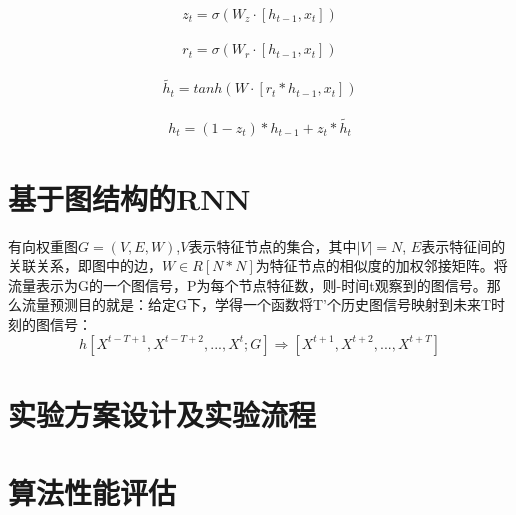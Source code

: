   \begin{equation}
    \begin{aligned}
        z_t = \sigma(W_z\cdot [h_{t-1},x_t])
    \end{aligned}
\end{equation}

\begin{equation}
    \begin{aligned}
        r_t = \sigma(W_r\cdot[h_{t-1},x_t])
    \end{aligned}
\end{equation}

\begin{equation}
    \begin{aligned}
        \widetilde {h_t} = tanh(W\cdot[r_t * h_{t-1}, x_t])
    \end{aligned}
\end{equation}

\begin{equation}
    \begin{aligned}
        h_t = (1- z_t) * h_{t-1} + z_t * \widetilde{h_t}
    \end{aligned}
\end{equation}

\section{基于图结构的RNN}
有向权重图$G=(V,E,W)$,$V$表示特征节点的集合，其中$|V|=N$, $E$表示特征间的关联关系，即图中的边，$W∈R[N*N]$为特征节点的相似度的加权邻接矩阵。将流量表示为G的一个图信号，P为每个节点特征数，则-时间t观察到的图信号。那么流量预测目的就是：给定G下，学得一个函数将T'个历史图信号映射到未来T时刻的图信号：
\begin{equation}
    h[X^{t-T+1}, X^{t-T+2},...,X^{t}; G] \Rightarrow [X^{t+1}, X^{t+2}, ..., X^{t+T}]
\end{equation}






\section{实验方案设计及实验流程}


\section{算法性能评估}

